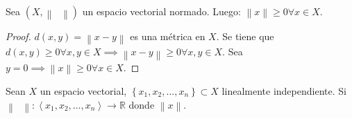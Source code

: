 \begin{proposition}
    Sea $\left(X, \left\|\phantom{\cdot}\right\|\right)$ un espacio vectorial normado. Luego: $\left\|x\right\|\geq 0\forall x\in X$.
\end{proposition}

\begin{proof}
    $d\left(x,y\right)=\left\|x-y\right\|$ es una métrica en $X$.
    Se tiene que $d\left(x,y\right)\geq0\forall x,y\in X\implies \left\|x-y\right\|\geq 0\forall x,y\in X$.
    Sea $y=0\implies\left\|x\right\|\geq 0\forall x\in X$.
\end{proof}

\begin{proposition*}
    Sean $X$ un espacio vectorial, $\left\{x_{1},x_{2},\dotsc,x_{n}\right\}\subset X$ linealmente independiente. Si $\left\|\phantom{\cdot}\right\|\colon\left\langle x_{1},x_{2},\dotsc,x_{n}\right\rangle\to\mathbb{R}$ donde $\left\|x\right\|$.
\end{proposition*}